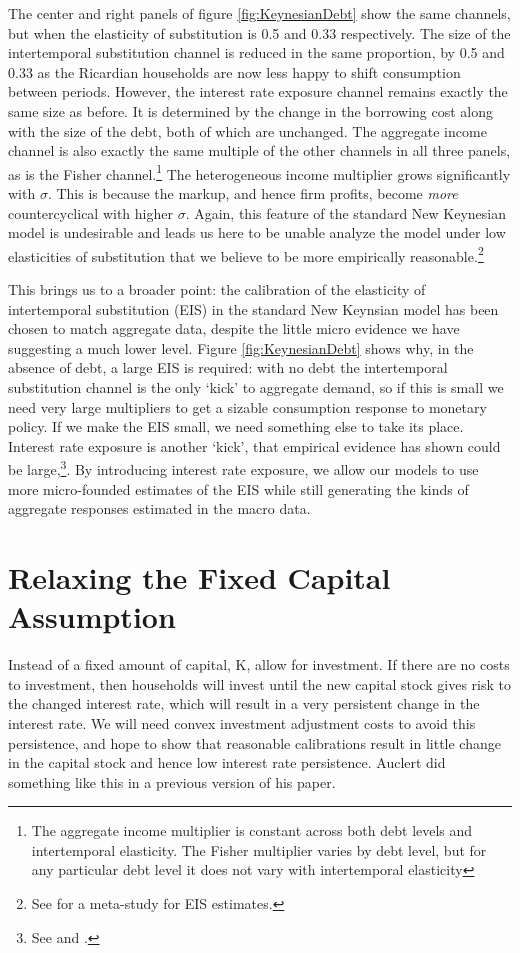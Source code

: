 \documentclass[titlepage]{\econtex}\newcommand{\texname}{ConsumptionHeterogeneity}
\begin{document}
The center and right panels of figure \ref{fig:KeynesianDebt} show the same channels, but when the elasticity of substitution is 0.5 and 0.33 respectively. The size of the intertemporal substitution channel is reduced in the same proportion, by 0.5 and 0.33 as the Ricardian households are now less happy to shift consumption between periods. However, the interest rate exposure channel remains exactly the same size as before. It is determined by the change in the borrowing cost along with the size of the debt, both of which are unchanged. The aggregate income channel is also exactly the same multiple of the other channels in all three panels, as is the Fisher channel.\footnote{The aggregate income multiplier is constant across both debt levels and intertemporal elasticity. The Fisher multiplier varies by debt level, but for any particular debt level it does not vary with intertemporal elasticity} The heterogeneous income multiplier grows significantly with $\sigma$. This is because the markup, and hence firm profits, become \textit{more} countercyclical with higher $\sigma$. Again, this feature of the standard New Keynesian model is undesirable and leads us here to be unable analyze the model under low elasticities of substitution that we believe to be more empirically reasonable.\footnote{See \cite{havranek_measuring_2015} for a meta-study for EIS estimates.}

This brings us to a broader point: the calibration of the elasticity of intertemporal substitution (EIS) in the standard New Keynsian model has been chosen to match aggregate data, despite the little micro evidence we have suggesting a much lower level. Figure \ref{fig:KeynesianDebt} shows why, in the absence of debt, a large EIS is required: with no debt the intertemporal substitution channel is the only `kick' to aggregate demand, so if this is small we need very large multipliers to get a sizable consumption response to monetary policy. If we make the EIS small, we need something else to take its place. Interest rate exposure is another `kick', that empirical evidence has shown could be large,\footnote{See \cite{auclert_monetary_2017} and \cite{ckConsumption}.}. By introducing interest rate exposure, we allow our models to use more micro-founded estimates of the EIS while still generating the kinds of aggregate responses estimated in the macro data.

\section{Relaxing the Fixed Capital Assumption}
Instead of a fixed amount of capital, K, allow for investment. If there are no costs to investment, then households will invest until the new capital stock gives risk to the changed interest rate, which will result in a very persistent change in the interest rate. We will need convex investment adjustment costs to avoid this persistence, and hope to show that reasonable calibrations result in little change in the capital stock and hence low interest rate persistence. Auclert did something like this in a previous version of his paper.
\end{document}
